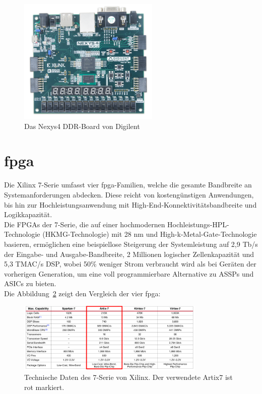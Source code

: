 \begin{figure}[H]
\centering
\includegraphics[width=0.6\textwidth]{Hauptteil/nexys-4-ddr-2.png}
\caption{Das Nexys4 DDR-Board von Digilent~\cite{digilent}}\label{fig:nexys4}
\end{figure}



\section{\ac{fpga}}\label{kap:fpga}
Die Xilinx 7-Serie umfasst vier \ac{fpga}-Familien, welche die gesamte Bandbreite an Systemanforderungen abdecken. Diese reicht von kostengünstigen Anwendungen, bis hin zur Hochleistungsanwendung mit High-End-Konnektivitätsbandbreite und Logikkapazität. \\
Die FPGAs der 7-Serie, die auf einer hochmodernen Hochleistungs-HPL-Technologie (HKMG-Technologie) mit 28 nm und High-k-Metal-Gate-Technologie basieren,
 ermöglichen eine beispiellose Steigerung der Systemleistung auf 2,9 Tb/s der Eingabe- und Ausgabe-Bandbreite, 2 Millionen logischer Zellenkapazität und 5,3 TMAC/s DSP,
 wobei 50\% weniger Strom verbraucht wird als bei Geräten der vorherigen Generation, um eine voll programmierbare Alternative zu ASSPs und ASICs zu bieten.\\
 Die Abbildung~\ref{fig:7serie} zeigt den Vergleich der vier \ac{fpga}:~\cite{artix7}\\

 \begin{figure}[H]
 \centering
 \includegraphics[width=0.8\textwidth]{Hauptteil/7serie.png}
 \caption{Technische Daten des 7-Serie von Xilinx. Der verwendete Artix7 ist rot markiert.~\cite{artix7}}\label{fig:7serie}
 \end{figure}


